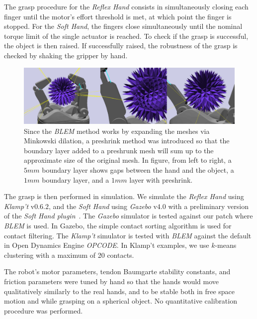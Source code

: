 The grasp procedure for the \emph{Reflex Hand} consists in simultaneously closing each finger until the motor's effort threshold is met, at which point the finger is stopped. For the \emph{Soft Hand}, the fingers close simultaneously until the nominal torque limit of the single actuator is reached. To check if the grasp is successful, the object is then raised. If successfully raised, the robustness of the grasp is checked by shaking the gripper by hand.


\begin{figure}[!hbt]
\begin{center}
        \includegraphics[width=0.95\columnwidth]     {images/ssoch/preshrink}
        \caption{Since the \emph{BLEM} method works by expanding the meshes via Minkowski dilation, a preshrink method was introduced so that the boundary layer added to a preshrunk mesh will sum up to the approximate size of the original mesh. In figure, from left to right, a $5mm$ boundary layer shows gaps between the hand and the object, a $1mm$ boundary layer, and a $1mm$ layer with preshrink. }
        \label{Preshrink}
        \end{center}
\end{figure}


The grasp is then performed in simulation.
We simulate the \emph{Reflex Hand} using \emph{Klamp't} v$0.6.2$, and the \emph{Soft Hand} using \emph{Gazebo} v$4.0$ with a preliminary version of the \emph{Soft Hand plugin}~\cite{Rosales15SHP}.
The \emph{Gazebo} simulator is tested against our patch \cite{Rocchi15GBP} where \emph{BLEM} is used. In Gazebo, the simple contact sorting algorithm is used for contact filtering. The \emph{Klamp't} simulator is tested with  \emph{BLEM} against the default in Open Dynamics Engine \emph{OPCODE}.  In Klamp't examples, we use $k$-means clustering with a maximum of 20 contacts.

The robot's motor parameters, tendon Baumgarte stability constants, and friction parameters were tuned by hand so that the hands would move qualitatively similarly to the real hands, and to be stable both in free space motion and while grasping on a spherical object.  No quantitative calibration procedure was performed.



